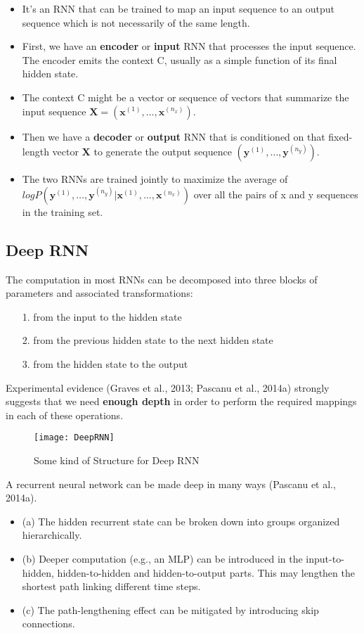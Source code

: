 		\begin{itemize}
			\item It's an RNN that can be trained to map an input sequence to an output sequence which is not necessarily of the same length.
			\item First, we have an \textbf{encoder} or \textbf{input} RNN that processes the input sequence. The encoder emits the context C, usually as a simple function of its final hidden state.
			\item The context C might be a vector or sequence of
			vectors that summarize the input sequence $\mathbf{X} = (\mathbf{x}^{(1)},\ldots,\mathbf{x}^{(n_x)})$.
			\item Then we have a \textbf{decoder} or \textbf{output} RNN that is conditioned on that fixed-length vector $\mathbf{X}$ to generate the output sequence $(\mathbf{y}^{(1)},\ldots,\mathbf{y}^{(n_y)})$.
			\item The two RNNs are trained jointly to maximize the average of \\
			$log P(\mathbf{y}^{(1)},\ldots,\mathbf{y}^{(n_y)}|\mathbf{x}^{(1)},\ldots,\mathbf{x}^{(n_x)})$ over all the pairs of x and y
			sequences in the training set.
		\end{itemize}
	\subsection{Deep RNN}
		The computation in most RNNs can be decomposed into three blocks of parameters and associated transformations:

		\begin{itemize}
			\item[1.] from the input to the hidden state
			\item[2.] from the previous hidden state to the next hidden state
			\item[3.] from the hidden state to the output
		\end{itemize}
		Experimental evidence (Graves et al., 2013; Pascanu et al., 2014a) strongly suggests that we need \textbf{enough depth} in order to perform the required mappings in each of these operations.
		\begin{figure}[H]
			\centering
			\texttt{[image: DeepRNN]}
			\caption{Some kind of Structure for Deep RNN}
		\end{figure}
	A recurrent neural network can be made deep in many ways (Pascanu
	et al., 2014a). 
	\begin{itemize}
		\item (a) The hidden recurrent state can be broken down into groups organized hierarchically. 
		\item (b) Deeper computation (e.g., an MLP) can be introduced in the input-to- hidden, hidden-to-hidden and hidden-to-output parts. This may lengthen the shortest path linking different time steps. 
		\item (c) The path-lengthening effect can be mitigated by introducing skip connections.
	\end{itemize}
		
